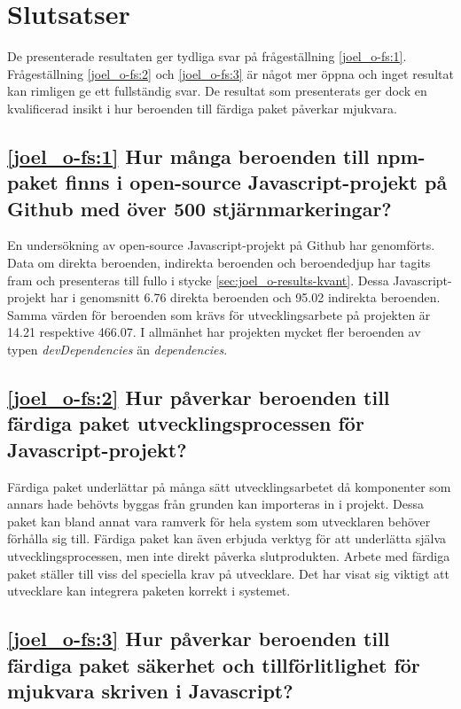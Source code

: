 \section{Slutsatser}
\label{sec:joel_o-conclusion}
De presenterade resultaten ger tydliga svar på frågeställning \ref{joel_o-fs:1}. Frågeställning \ref{joel_o-fs:2} och \ref{joel_o-fs:3} är något mer öppna och inget resultat kan rimligen ge ett fullständig svar. De resultat som presenterats ger dock en kvalificerad insikt i hur beroenden till färdiga paket påverkar mjukvara.

\subsection*{\ref{joel_o-fs:1} Hur många beroenden till npm-paket finns i open-source Javascript-projekt på Github med över 500 stjärnmarkeringar?}

En undersökning av open-source Javascript-projekt på Github har genomförts. Data om direkta beroenden, indirekta beroenden och beroendedjup har tagits fram och presenteras till fullo i stycke \ref{sec:joel_o-results-kvant}. Dessa Javascript-projekt har i genomsnitt 6.76 direkta beroenden och 95.02 indirekta beroenden. Samma värden för beroenden som krävs för utvecklingsarbete på projekten är 14.21 respektive 466.07. I allmänhet har projekten mycket fler beroenden av typen \textit{devDependencies} än \textit{dependencies}.

\subsection*{\ref{joel_o-fs:2} Hur påverkar beroenden till färdiga paket utvecklingsprocessen för Javascript-projekt?}

Färdiga paket underlättar på många sätt utvecklingsarbetet då komponenter som annars hade behövts byggas från grunden kan importeras in i projekt. Dessa paket kan bland annat vara ramverk för hela system som utvecklaren behöver förhålla sig till. Färdiga paket kan även erbjuda verktyg för att underlätta själva utvecklingsprocessen, men inte direkt påverka slutprodukten. Arbete med färdiga paket ställer till viss del speciella krav på utvecklare. Det har visat sig viktigt att utvecklare kan integrera paketen korrekt i systemet.

\subsection*{\ref{joel_o-fs:3} Hur påverkar beroenden till färdiga paket säkerhet och tillförlitlighet för mjukvara skriven i Javascript?}

